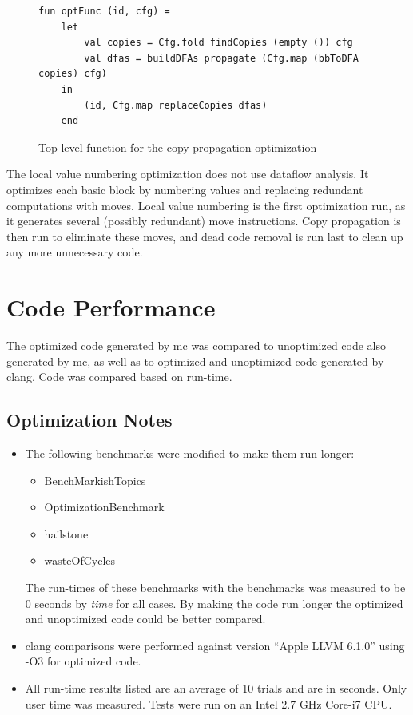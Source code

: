 \documentclass[12pt]{article}
\begin{document}
\begin{figure}[h!]
\centering
\begin{BVerbatim}[fontsize=\scriptsize]
  fun optFunc (id, cfg) =
    let
        val copies = Cfg.fold findCopies (empty ()) cfg
        val dfas = buildDFAs propagate (Cfg.map (bbToDFA copies) cfg)
    in
        (id, Cfg.map replaceCopies dfas)
    end
\end{BVerbatim}
\caption{Top-level function for the copy propagation optimization}
\end{figure}

The local value numbering optimization does not use dataflow analysis. It optimizes each basic block by numbering values and replacing redundant computations with moves. Local value numbering is the first optimization run, as it generates several (possibly redundant) move instructions. Copy propagation is then run to eliminate these moves, and dead code removal is run last to clean up any more unnecessary code.


\section*{Code Performance}
The optimized code generated by mc was compared to unoptimized code also generated by mc, as well as to optimized and unoptimized code generated by clang. Code was compared based on run-time.

\subsection*{Optimization Notes}
\begin{itemize}
\item The following benchmarks were modified to make them run longer:
\begin{itemize}
\item BenchMarkishTopics
\item OptimizationBenchmark
\item hailstone
\item wasteOfCycles
\end{itemize}
The run-times of these benchmarks with the benchmarks was measured to be 0 seconds by \textit{time} for all cases. By making the code run longer the optimized and unoptimized code could be better compared.
\item clang comparisons were performed against version ``Apple LLVM 6.1.0'' using -O3 for optimized code.
\item All run-time results listed are an average of 10 trials and are in seconds. Only user time was measured. Tests were run on an Intel 2.7 GHz Core-i7 CPU.
\end{itemize}
\end{document}

